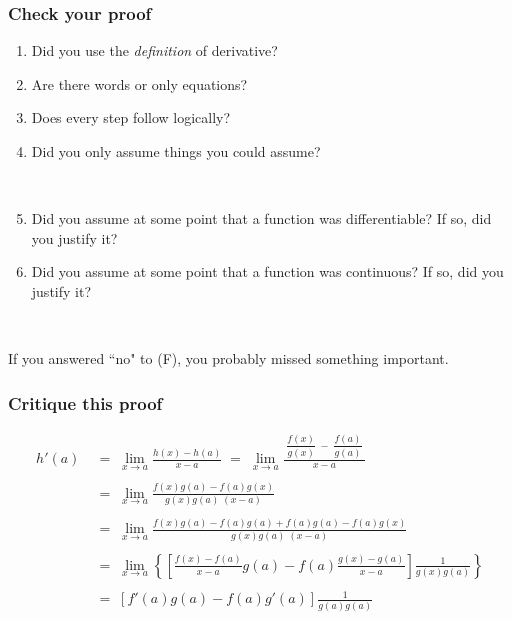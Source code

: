 \documentclass[14pt]{beamer}
\newcommand{\setsize}[1]{\fontsize{#1}{#1}\selectfont} %
\newcommand{\smallerfont}{\setsize{13}} %
\begin{document}
\begin{frame}[t]
\frametitle{Check your proof}

\begin{enumerate}
	\item Did you use the \emph{definition} of derivative?
	\item  Are there words or only equations?
	\item  Does every step follow logically?
	\item  Did you only assume things you could assume?
	
	\
	
	\item  Did you assume at some point that a function was differentiable?  If so, did you justify it?

	\item \label{qu:cont} Did you assume at some point that a function was continuous?  If so, did you justify it?
	
\end{enumerate}

\

	If you answered ``no" to (F), you probably missed something important.

\end{frame}
\begin{frame}[t]
\smallerfont
\frametitle{Critique this proof}
\vspace{-1cm}
	\begin{align*}
		h'(a) \; &= \;
			\lim_{x \to a} \frac{h(x) - h(a) }{x - a} \; = \; \lim_{x \to a} \frac{\; \dfrac{f(x)}{g(x)} \; - \; \dfrac{f(a)}{g(a)} \;}{x-a}
		\\ \ \\ & = \;
			\lim_{x \to a} \frac{f(x)g(a) - f(a)g(x)}{g(x)g(a) \; (x-a)}
			\\ \ \\& = \;
			\lim_{x \to a} \frac{f(x)g(a) - f(a)g(a) + f(a)g(a) - f(a) g(x)}{g(x) g(a) \; (x-a)}
			\\ \ \\ & = \;
			\lim_{x \to a} \left\{ \left[   \frac{f(x) - f(a)}{x-a} g(a) - f(a) \frac{g(x) - g(a)}{x-a} \right] \frac{1}{g(x) g(a)} \right\}
			\\ \ \\ & = \;
			\left[ f'(a) g(a) - f(a) g'(a) \right] \frac{1}{g(a) g(a)}
	\end{align*}
\end{frame}
\end{document}
